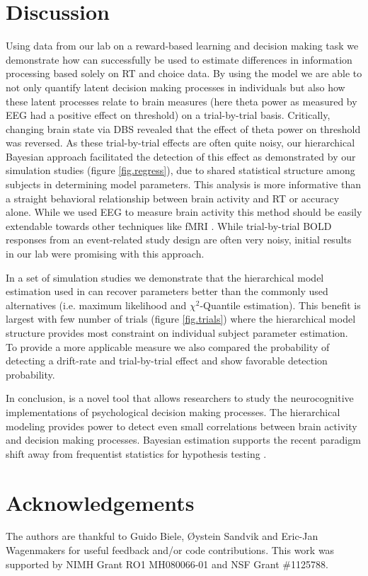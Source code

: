 \documentclass[letterpaper,10pt,english]{article}
\begin{document}
\section*{Discussion}
Using data from our lab on a reward-based learning and decision making
task \citep{CavanaghWieckiCohenEtAl11} we demonstrate how 
can successfully be used to estimate differences in information
processing based solely on RT and choice data. By using the
 model we are able to not only quantify latent
decision making processes in individuals but also how these latent
processes relate to brain measures (here theta power as measured by
EEG had a positive effect on threshold) on a trial-by-trial basis.
Critically, changing brain state via DBS revealed that the effect of
theta power on threshold was reversed. As these trial-by-trial effects
are often quite noisy, our hierarchical Bayesian approach facilitated
the detection of this effect as demonstrated by our simulation studies (figure \ref{fig.regress}), due to shared statistical structure
among subjects in determining model parameters. This analysis is more
informative than a straight behavioral relationship between brain
activity and RT or accuracy alone. While we used EEG to measure brain
activity this method should be easily extendable towards other
techniques like fMRI \citep[e.g.][]{MaanenBrownEicheleEtAl11}. While
trial-by-trial BOLD responses from an event-related study design are
often very noisy, initial results in our lab were promising with this
approach.

In a set of simulation studies we demonstrate that the hierarchical
model estimation used in  can recover parameters better
than the commonly used alternatives (i.e. maximum likelihood and
$\chi^2$-Quantile estimation). This benefit is largest with few number
of trials (figure \ref{fig.trials}) where the hierarchical model
structure provides most constraint on individual subject parameter
estimation. To provide a more applicable measure we also compared the
probability of detecting a drift-rate and trial-by-trial effect and
show favorable detection probability.

In conclusion,  is a novel tool that allows researchers to
study the neurocognitive implementations of psychological decision
making processes. The hierarchical modeling provides power to detect
even small correlations between brain activity and decision making
processes. Bayesian estimation supports the recent paradigm shift away
from frequentist statistics for hypothesis testing
\citep{Lindley65,Kruschke10,LeeWagenmakers13}.

\section*{Acknowledgements}
The authors are thankful to Guido Biele, Øystein Sandvik and Eric-Jan Wagenmakers for useful feedback and/or code contributions. This work was supported by NIMH Grant RO1 MH080066-01 and NSF Grant \#1125788.




\renewcommand{\indexname}{Index}
\printindex
\end{document}
